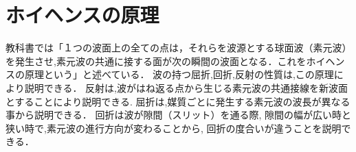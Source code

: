 \documentclass[a4j,twocolumn,uplatex]{jarticle}
\begin{document}
\section{ホイヘンスの原理}
教科書では「１つの波面上の全ての点は，それらを波源とする球面波（素元波）を発生させ,素元波の共通に接する面が次の瞬間の波面となる．これをホイヘンスの原理という」と述べている\cite{kyoukasyo}．
波の持つ屈折,回折,反射の性質は,この原理により説明できる．
反射は,波がはね返る点から生じる素元波の共通接線を新波面とすることにより説明できる.
屈折は,媒質ごとに発生する素元波の波長が異なる事から説明できる．
回折は波が隙間（スリット）を通る際,
隙間の幅が広い時と狭い時で,素元波の進行方向が変わることから,
回折の度合いが違うことを説明できる．
\vspace{-5mm}

\begin{figure}[htbp]

\end{figure}
\end{document}
